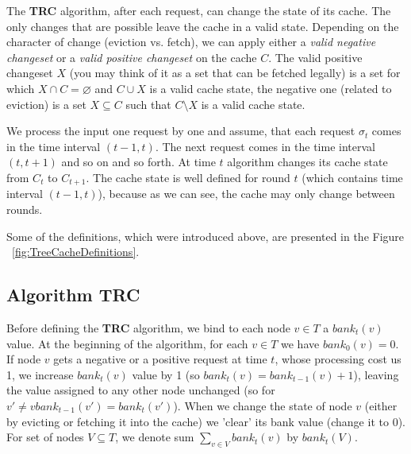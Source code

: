 The \textbf{TRC} algorithm, after each request, can change the state of its
cache. The only changes that are possible leave the cache in a valid state.
Depending on the character of change (eviction vs. fetch), we can apply either a
\textit{valid negative changeset} or a \textit{valid positive changeset} on the
cache $C$. The valid positive changeset $X$ (you may think of it as a set that
can be fetched legally) is a set for which $X \cap C = \varnothing$ and $C \cup
X$ is a valid cache state, the negative one (related to eviction) is a set $X
\subseteq C$ such that $C \setminus X$ is a valid cache state.

We process the input one request by one and assume, that each request $\sigma_t$
comes in the time interval $(t-1, t)$. The next request comes in the time
interval $(t, t + 1)$ and so on and so forth. At time $t$ algorithm changes its
cache state from $C_{t}$ to $C_{t+1}$. The cache state is well defined for round
$t$ (which contains time interval $(t-1, t)$), because as we can see, the cache
may only change between rounds.

Some of the definitions, which were introduced above, are presented in the
Figure ~\ref{fig:TreeCacheDefinitions}.



\subsection{Algorithm TRC}

Before defining the \textbf{TRC} algorithm, we bind to each node $v \in T$ a
$bank_{t}(v)$ value. At the beginning of the algorithm, for each $v \in T$ we
have $bank_{0}(v) = 0$. If node $v$ gets a negative or a positive request at
time $t$, whose processing cost us 1, we increase $bank_{t}(v)$ value by 1 (so
$bank_{t}(v) = bank_{t-1}(v) + 1$), leaving the value assigned to any other node
unchanged (so for $v' \neq v bank_{t-1}(v') = bank_{t}(v')$). When we change the
state of node $v$ (either by evicting or fetching it into the cache) we 'clear'
its bank value (change it to $0$). For set of nodes $V \subseteq T$, we denote
sum $\sum_{v \in V} bank_{t}(v)$ by $bank_{t}(V)$.

